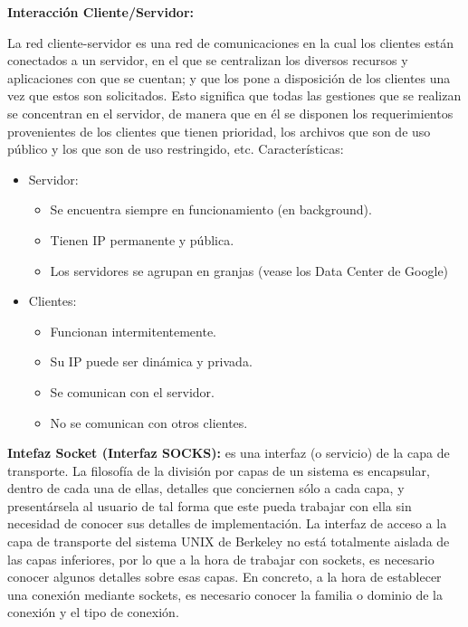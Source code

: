 \documentclass[a4paper,11pt]{article}
\begin{document}
\textbf{Interacción Cliente/Servidor:} 

La red cliente-servidor es una red de comunicaciones en la cual los clientes están conectados a un servidor, en el que se centralizan los diversos recursos y aplicaciones con que se cuentan; y que los pone a disposición de los clientes una vez que estos son solicitados. Esto significa que todas las gestiones que se realizan se concentran en el servidor, de manera que en él se disponen los requerimientos provenientes de los clientes que tienen prioridad, los archivos que son de uso público y los que son de uso restringido, etc. Características:

\begin{itemize}
\item Servidor:

	\begin{itemize}
		\item Se encuentra siempre en funcionamiento (en background).
		\item Tienen IP permanente y pública.
		\item Los servidores se agrupan en granjas (vease los Data Center de Google)
	\end{itemize}
	
\item Clientes:

	\begin{itemize}
		\item Funcionan intermitentemente.
		\item Su IP puede ser dinámica y privada.
		\item Se comunican con el servidor.
		\item No se comunican con otros clientes.
	\end{itemize}
\end{itemize}

\textbf{Intefaz Socket (Interfaz SOCKS):} es una interfaz (o servicio) de la capa de transporte. La filosofía de la división por capas de un sistema es encapsular, dentro de cada una de ellas, detalles que conciernen sólo a cada capa, y presentársela al usuario de tal forma que este pueda trabajar con ella sin necesidad de conocer sus detalles de implementación. La interfaz de acceso a la capa de transporte del sistema UNIX de Berkeley no está totalmente aislada de las capas inferiores, por lo que a la hora de trabajar con sockets, es necesario conocer algunos detalles sobre esas capas. En concreto, a la hora de establecer una conexión mediante sockets, es necesario conocer la familia o dominio de la conexión y el tipo de conexión. \\
\end{document}
